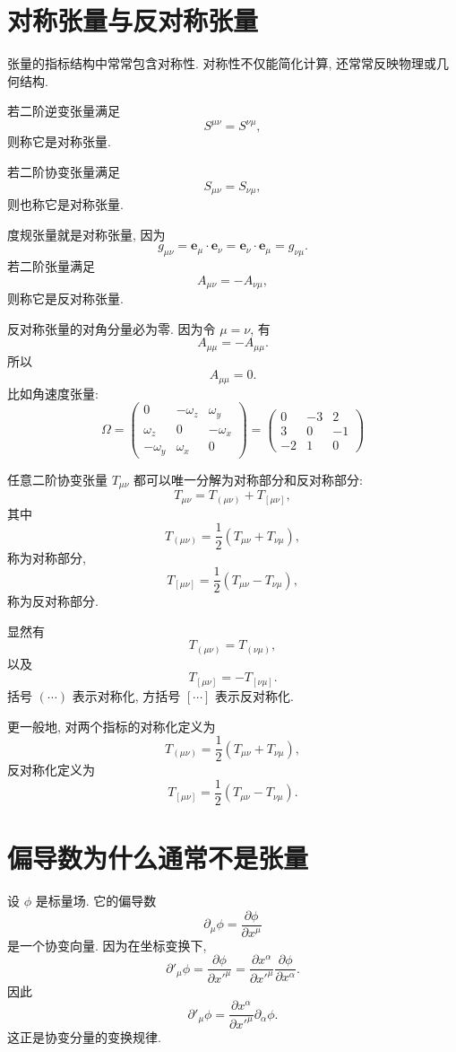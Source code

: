 \section{对称张量与反对称张量}

张量的指标结构中常常包含对称性. 对称性不仅能简化计算, 还常常反映物理或几何结构. 

若二阶逆变张量满足
\[
S^{\mu\nu}=S^{\nu\mu},
\]
则称它是对称张量. 

若二阶协变张量满足
\[
S_{\mu\nu}=S_{\nu\mu},
\]
则也称它是对称张量. 

度规张量就是对称张量, 因为
\[
g_{\mu\nu}
=
\bm{e}_\mu\cdot\bm{e}_\nu
=
\bm{e}_\nu\cdot\bm{e}_\mu
=
g_{\nu\mu}.
\]
若二阶张量满足
\[
A_{\mu\nu}=-A_{\nu\mu},
\]
则称它是反对称张量. 

反对称张量的对角分量必为零. 因为令 $\mu=\nu$, 有
\[
A_{\mu\mu}=-A_{\mu\mu}.
\]
所以
\[
A_{\mu\mu}=0.
\]
比如角速度张量:
\[
\Omega=\begin{pmatrix}
	0 & -\omega_z & \omega_y\\
	\omega_z & 0 & -\omega_x\\
	-\omega_y & \omega_x & 0
\end{pmatrix}=
\begin{pmatrix}
	0 & -3 & 2\\
	3 & 0 & -1\\
	-2 & 1 & 0
\end{pmatrix}
\]

任意二阶协变张量 $T_{\mu\nu}$ 都可以唯一分解为对称部分和反对称部分: 
\[
T_{\mu\nu}
=
T_{(\mu\nu)}+T_{[\mu\nu]},
\]
其中
\[
T_{(\mu\nu)}
=
\frac{1}{2}(T_{\mu\nu}+T_{\nu\mu}),
\]
称为对称部分, 
\[
T_{[\mu\nu]}
=
\frac{1}{2}(T_{\mu\nu}-T_{\nu\mu}),
\]
称为反对称部分. 

显然有
\[
T_{(\mu\nu)}=T_{(\nu\mu)},
\]
以及
\[
T_{[\mu\nu]}=-T_{[\nu\mu]}.
\]
括号 $(\cdots)$ 表示对称化, 方括号 $[\cdots]$ 表示反对称化. 

更一般地, 对两个指标的对称化定义为
\[
T_{(\mu\nu)}
=
\frac{1}{2}(T_{\mu\nu}+T_{\nu\mu}),
\]
反对称化定义为
\[
T_{[\mu\nu]}
=
\frac{1}{2}(T_{\mu\nu}-T_{\nu\mu}).
\]
\section{偏导数为什么通常不是张量}

设 $\phi$ 是标量场. 它的偏导数
\[
\partial_\mu\phi
=
\frac{\partial\phi}{\partial x^\mu}
\]
是一个协变向量. 因为在坐标变换下, 
\[
\partial'_\mu\phi
=
\frac{\partial\phi}{\partial x'^\mu}
=
\frac{\partial x^\alpha}{\partial x'^\mu}
\frac{\partial\phi}{\partial x^\alpha}.
\]
因此
\[
\partial'_\mu\phi
=
\frac{\partial x^\alpha}{\partial x'^\mu}
\partial_\alpha\phi.
\]
这正是协变分量的变换规律. 

